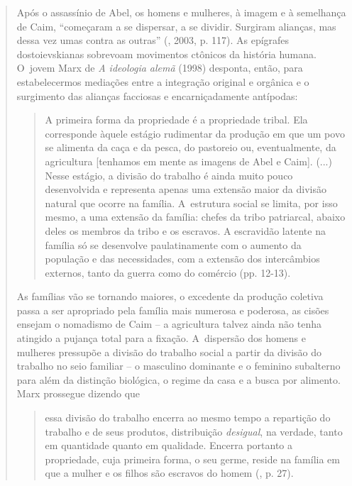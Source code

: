 {\begin{quote}
Após o assassínio de Abel, os homens e mulheres, à imagem e à semelhança
de Caim, ``começaram a se dispersar, a se dividir. Surgiram alianças,
mas dessa vez umas contra as outras'' (, 2003, p. 117). As
epígrafes dostoievskianas sobrevoam movimentos ctônicos da história
humana. O~jovem Marx de \emph{A ideologia alemã} (1998) desponta, então,
para estabelecermos mediações entre a integração original e orgânica e o
surgimento das alianças facciosas e encarniçadamente antípodas:

\begin{quote}
A primeira forma da propriedade é a propriedade tribal. Ela corresponde
àquele estágio rudimentar da produção em que um povo se alimenta da caça
e da pesca, do pastoreio ou, eventualmente, da agricultura {[}tenhamos
em mente as imagens de Abel e Caim{]}. (...) Nesse estágio, a divisão do
trabalho é ainda muito pouco desenvolvida e representa apenas uma
extensão maior da divisão natural que ocorre na família. A~estrutura
social se limita, por isso mesmo, a uma extensão da família: chefes da
tribo patriarcal, abaixo deles os membros da tribo e os escravos. A
escravidão latente na família só se desenvolve paulatinamente com o
aumento da população e das necessidades, com a extensão dos intercâmbios
externos, tanto da guerra como do comércio (pp. 12-13).
\end{quote}

As famílias vão se tornando maiores, o excedente da produção coletiva
passa a ser apropriado pela família mais numerosa e poderosa, as cisões
ensejam o nomadismo de Caim -- a agricultura talvez ainda não tenha
atingido a pujança total para a fixação. A~dispersão dos homens e
mulheres pressupõe a divisão do trabalho social a partir da divisão do
trabalho no seio familiar -- o masculino dominante e o feminino
subalterno para além da distinção biológica, o regime da casa e a busca
por alimento. Marx prossegue dizendo que

\begin{quote}
essa divisão do trabalho encerra ao mesmo tempo a repartição do trabalho
e de seus produtos, distribuição \emph{desigual}, na verdade, tanto em
quantidade quanto em qualidade. Encerra portanto a propriedade, cuja
primeira forma, o seu germe, reside na família em que a mulher e os
filhos são escravos do homem (, p. 27).
\end{quote}


\end{quote}}
